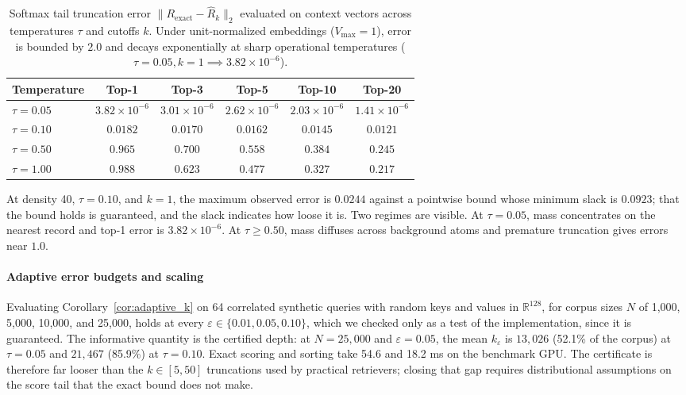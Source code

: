 \documentclass[preprint,12pt]{elsarticle}
\newcommand{\R}{\mathbb{R}}
\begin{document}
\begin{table}[t]
\centering
\caption{Softmax tail truncation error $\| R_{\mathrm{exact}} - \hat{R}_k \|_2$ evaluated on context vectors across temperatures $\tau$ and cutoffs $k$. Under unit-normalized embeddings ($V_{\max}=1$), error is bounded by $2.0$ and decays exponentially at sharp operational temperatures ($\tau = 0.05, k=1 \implies 3.82 \times 10^{-6}$).}
\label{tab:truncation_error}
\vspace{0.5em}
\footnotesize
\begin{tabular}{@{}lccccc@{}}
\toprule
Temperature & Top-1 & Top-3 & Top-5 & Top-10 & Top-20 \\
\midrule
$\tau = 0.05$ & $3.82 \times 10^{-6}$ & $3.01 \times 10^{-6}$ & $2.62 \times 10^{-6}$ & $2.03 \times 10^{-6}$ & $1.41 \times 10^{-6}$ \\
$\tau = 0.10$ & $0.0182$ & $0.0170$ & $0.0162$ & $0.0145$ & $0.0121$ \\
$\tau = 0.50$ & $0.965$ & $0.700$ & $0.558$ & $0.384$ & $0.245$ \\
$\tau = 1.00$ & $0.988$ & $0.623$ & $0.477$ & $0.327$ & $0.217$ \\
\bottomrule
\end{tabular}
\end{table}

At density 40, $\tau=0.10$, and $k=1$, the maximum observed error is $0.0244$ against a pointwise bound whose minimum slack is $0.0923$; that the bound holds is guaranteed, and the slack indicates how loose it is. Two regimes are visible. At $\tau = 0.05$, mass concentrates on the nearest record and top-1 error is $3.82 \times 10^{-6}$. At $\tau \ge 0.50$, mass diffuses across background atoms and premature truncation gives errors near $1.0$.

\paragraph{Adaptive error budgets and scaling}
Evaluating Corollary~\ref{cor:adaptive_k} on 64 correlated synthetic queries with random keys and values in $\R^{128}$, for corpus sizes $N$ of 1,000, 5,000, 10,000, and 25,000, holds at every $\varepsilon \in \{0.01, 0.05, 0.10\}$, which we checked only as a test of the implementation, since it is guaranteed. The informative quantity is the certified depth: at $N=25{,}000$ and $\varepsilon=0.05$, the mean $k_\varepsilon$ is $13{,}026$ (52.1\% of the corpus) at $\tau=0.05$ and $21{,}467$ (85.9\%) at $\tau=0.10$. Exact scoring and sorting take 54.6 and 18.2 ms on the benchmark GPU. The certificate is therefore far looser than the $k\in[5,50]$ truncations used by practical retrievers; closing that gap requires distributional assumptions on the score tail that the exact bound does not make.
\end{document}
